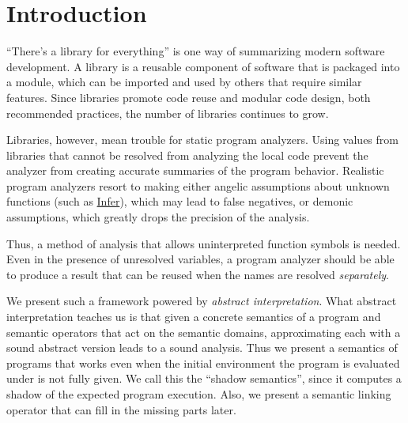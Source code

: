 \section{Introduction}
``There's a library for everything'' is one way of summarizing modern software development.
A library is a reusable component of software that is packaged into a module, which can be imported and used by others that require similar features.
Since libraries promote code reuse and modular code design, both recommended practices, the number of libraries continues to grow.

Libraries, however, mean trouble for static program analyzers.
Using values from libraries that cannot be resolved from analyzing the local code prevent the analyzer from creating accurate summaries of the program behavior.
Realistic program analyzers resort to making either angelic assumptions about unknown functions (such as \href{https://fbinfer.com/docs/next/checker-pulse/#unknown-functions}{Infer}), which may lead to false negatives,
or demonic assumptions, which greatly drops the precision of the analysis.

Thus, a method of analysis that allows uninterpreted function symbols is needed.
Even in the presence of unresolved variables, a program analyzer should be able to produce a result that can be reused when the names are resolved \emph{separately}.

We present such a framework powered by \emph{abstract interpretation}.
What abstract interpretation teaches us is that given a concrete semantics of a program and semantic operators that act on the semantic domains, approximating each with a sound abstract version leads to a sound analysis.
Thus we present a semantics of programs that works even when the initial environment the program is evaluated under is not fully given.
We call this the ``shadow semantics'', since it computes a shadow of the expected program execution.
Also, we present a semantic linking operator that can fill in the missing parts later.

